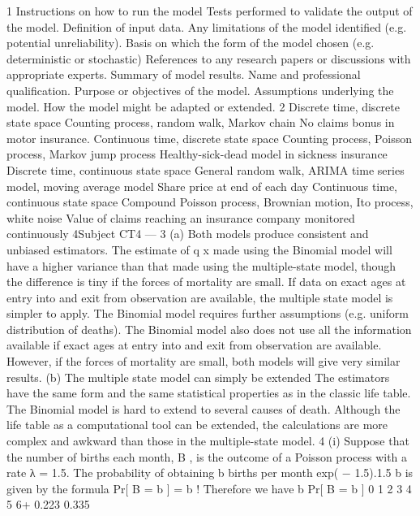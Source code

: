 \documentclass[a4paper,12pt]{article}
\begin{document}
\begin{enumerate}
[1]
1
Instructions on how to run the model
Tests performed to validate the output of the model.
Definition of input data.
Any limitations of the model identified (e.g. potential unreliability).
Basis on which the form of the model chosen (e.g. deterministic or stochastic)
References to any research papers or discussions with appropriate experts.
Summary of model results.
Name and professional qualification.
Purpose or objectives of the model.
Assumptions underlying the model.
How the model might be adapted or extended.
2
Discrete time, discrete state space
Counting process, random walk, Markov chain
No claims bonus in motor insurance.
Continuous time, discrete state space
Counting process, Poisson process, Markov jump process
Healthy-sick-dead model in sickness insurance
Discrete time, continuous state space
General random walk, ARIMA time series model, moving average model
Share price at end of each day
Continuous time, continuous state space
Compound Poisson process, Brownian motion, Ito process, white noise
Value of claims reaching an insurance company monitored
continuously
4Subject CT4 — %
3
(a)
Both models produce consistent and unbiased estimators.
The estimate of q x made using the Binomial model
will have a higher variance than that made using the
multiple-state model, though the difference is tiny if the forces of mortality are small.
If data on exact ages at entry into and exit from observation are available, the multiple state model is
simpler to apply. The Binomial model requires further
assumptions (e.g. uniform distribution of deaths). The Binomial model also does not use all the information
available if exact ages at entry into and exit from observation are available.
However, if the forces of mortality are small, both models will give very similar results.
(b)
The multiple state model can simply be extended
The estimators have the same form and the same statistical properties as in the classic life table.
The Binomial model is hard to extend to several causes of death. Although the life table as a computational tool can be
extended, the calculations are more complex and awkward than those in the multiple-state model.
4
(i)
Suppose that the number of births each month, B , is the outcome of a Poisson
process with a rate λ = 1.5.
The probability of obtaining b births per month
exp( − 1.5).1.5 b
is given by the formula Pr[ B = b ] =
b !
Therefore we have
b Pr[ B = b ]
0
1
2
3
4
5
6+ 0.223
0.335

\end{enumerate}
\end{document}
